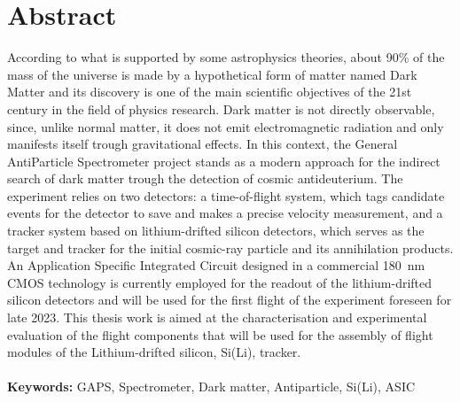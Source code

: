\chapter*{Abstract} 
According to what is supported by some astrophysics theories, about 90\% of the mass of the universe is made by a hypothetical form of matter named Dark Matter and its discovery is one of the main scientific objectives of the 21st century in the field of physics research. Dark matter is not directly observable, since, unlike normal matter, it does not emit electromagnetic radiation and only manifests itself trough gravitational effects. 
In this context, the General AntiParticle Spectrometer project stands as a modern approach for the indirect search of dark matter trough the detection of cosmic antideuterium. The experiment relies on two detectors: a time-of-flight system, which tags candidate events for the detector to save and makes a precise velocity measurement, and a tracker system based on lithium-drifted silicon detectors, which serves as the target and tracker for the initial cosmic-ray particle and its annihilation products. An Application Specific Integrated Circuit designed in a commercial \SI{180}{\nano\meter} CMOS technology is currently employed for the readout of the lithium-drifted silicon detectors and will be used for the first flight of the experiment foreseen for late 2023. This thesis work is aimed at the characterisation and experimental evaluation of the flight components that will be used for the assembly of flight modules of the Lithium-drifted silicon, Si(Li), tracker.\\\\

\noindent
\textbf{Keywords: } GAPS, Spectrometer, Dark matter, Antiparticle, Si(Li), ASIC

